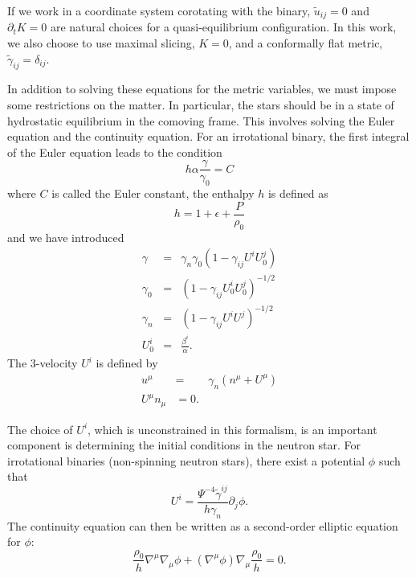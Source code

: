 \documentclass[aps,prd,amsmath,floatfix
,twocolumn
,superscriptaddress,nofootinbib,showpacs]{revtex4-1}
\theoremstyle{plain} \newtheorem{thm}{Theorem} \newtheorem{lem}{Lemma}
\begin{document}
  If we work in a coordinate system corotating with the binary,
  $\tilde{u}_{ij} = 0$ and $\partial_t K = 0$ are natural choices for
  a quasi-equilibrium configuration. In this work, we also choose to
  use maximal slicing, $K=0$, and a conformally flat metric,
  $\tilde{\gamma}_{ij}=\delta_{ij}$.

In addition to solving these equations for the metric variables, we
must impose some restrictions on the matter. In particular, the stars
should be in a state of hydrostatic equilibrium in the comoving
frame. This involves solving the Euler equation and the continuity
equation. For an irrotational binary, the first integral of the Euler
equation leads to the condition
\begin{equation}
h\alpha\frac{\gamma}{\gamma_0} = C
\end{equation}
where $C$ is called the Euler constant, the enthalpy $h$ is defined as
\begin{equation}
h = 1+\epsilon + \frac{P}{\rho_0}
\end{equation}
and we have introduced
\begin{eqnarray}
\gamma &=& \gamma_n\gamma_0\left(1 -
\gamma_{ij}U^iU^j_0\right)\\ \gamma_0 &=& \left(1 -
\gamma_{ij}U^i_0U^j_0\right)^{-1/2}\\ \gamma_n &=& \left(1 -
\gamma_{ij}U^iU^j\right)^{-1/2}\\ U^i_0 &=& \frac{\beta^{i}}{\alpha}.
\end{eqnarray}
The 3-velocity $U^i$ is defined by
\begin{eqnarray}
u^{\mu} &=& \gamma_n (n^\mu + U^\mu)\\ U^\mu n_\mu & = 0.
\end{eqnarray}

The choice of $U^i$, which is unconstrained in this formalism, is an
important component is determining the initial conditions in the
neutron star. For irrotational binaries (non-spinning neutron stars),
there exist a potential $\phi$ such that
\begin{equation}
U^i = \frac{\Psi^{-4}\tilde{\gamma}^{ij}}{h\gamma_n}\partial_j\phi.
\end{equation}
The continuity equation can then be written as a second-order elliptic
equation for $\phi$:
\begin{equation}
\label{eq:Continuity}
\frac{\rho_0}{h}\nabla^{\mu}\nabla_{\mu}\phi +
\left(\nabla^{\mu}\phi\right)\nabla_{\mu}\frac{\rho_0}{h}=0.
\end{equation}
\end{document}

